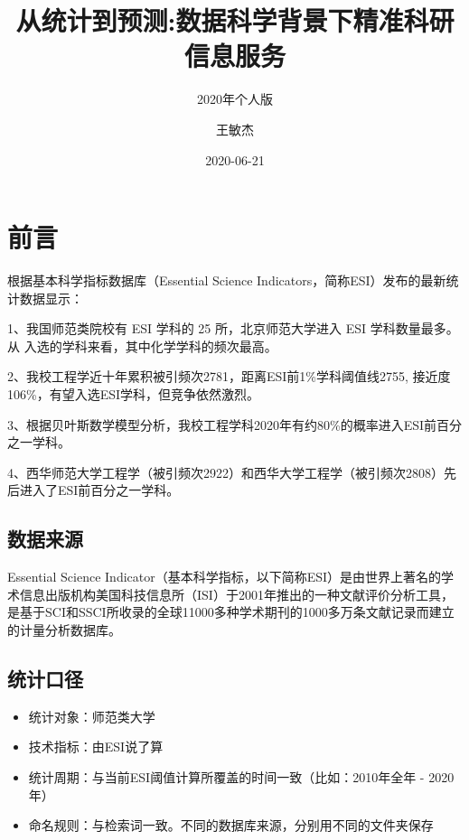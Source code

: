 \documentclass[cn, 11pt, fancy, hide]{elegantbook}
\title{从统计到预测:数据科学背景下精准科研信息服务}
\subtitle{2020年个人版}
\author{王敏杰}
\date{2020-06-21}
\providecommand{\tightlist}{%
  \setlength{\itemsep}{0pt}\setlength{\parskip}{0pt}}
\begin{document}
\maketitle

{
\setcounter{tocdepth}{2}
\tableofcontents
}
\mainmatter

\hypersetup{pageanchor=true}

\hypertarget{ux524dux8a00}{%
\chapter*{前言}\label{ux524dux8a00}}

根据基本科学指标数据库（Essential Science Indicators，简称ESI）发布的最新统计数据显示：

1、我国师范类院校有 ESI 学科的 25 所，北京师范大学进入 ESI 学科数量最多。从
入选的学科来看，其中化学学科的频次最高。

2、我校工程学近十年累积被引频次2781，距离ESI前1\%学科阈值线2755, 接近度106\%，有望入选ESI学科，但竞争依然激烈。

3、根据贝叶斯数学模型分析，我校工程学科2020年有约80\%的概率进入ESI前百分之一学科。

4、西华师范大学工程学（被引频次2922）和西华大学工程学（被引频次2808）先后进入了ESI前百分之一学科。

\hypertarget{ux6570ux636eux6765ux6e90}{%
\section*{数据来源}\label{ux6570ux636eux6765ux6e90}}

Essential Science Indicator（基本科学指标，以下简称ESI）是由世界上著名的学术信息出版机构美国科技信息所（ISI）于2001年推出的一种文献评价分析工具，是基于SCI和SSCI所收录的全球11000多种学术期刊的1000多万条文献记录而建立的计量分析数据库。

\hypertarget{ux7edfux8ba1ux53e3ux5f84}{%
\section*{统计口径}\label{ux7edfux8ba1ux53e3ux5f84}}

\begin{itemize}
\tightlist
\item
  统计对象：师范类大学
\item
  技术指标：由ESI说了算
\item
  统计周期：与当前ESI阈值计算所覆盖的时间一致（比如：2010年全年 - 2020年）
\item
  命名规则：与检索词一致。不同的数据库来源，分别用不同的文件夹保存
\end{itemize}
\end{document}
